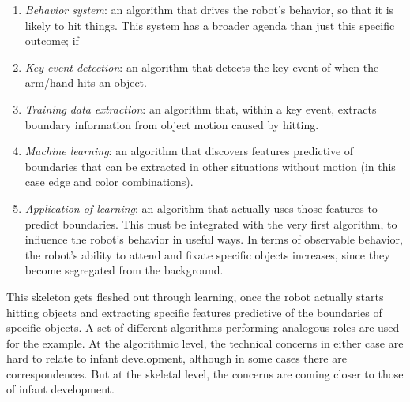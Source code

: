 \begin{enumerate} \pflist

\item {\em Behavior system}: an algorithm that drives the robot's
behavior, so that it is likely to hit things.  This system has a 
broader agenda than just this specific outcome; if

\item {\em Key event detection}: an algorithm that detects the key event of
when the arm/hand hits an object.

\item {\em Training data extraction}: an algorithm that, within a key event,
extracts boundary information from object motion caused by hitting.

\item {\em Machine learning}: an algorithm that discovers features
predictive of boundaries that can be extracted in other situations
without motion (in this case edge and color combinations).

\item {\em Application of learning}: an algorithm that actually uses
those features to predict boundaries.  This must be integrated with
the very first algorithm, to influence the robot's behavior in useful
ways.  In terms of observable behavior, the robot's ability to attend
and fixate specific objects increases, since they become segregated from
the background.

\end{enumerate}

\noindent
This skeleton gets fleshed out through learning, once the
robot actually starts hitting objects and extracting specific features
predictive of the boundaries of specific objects.  
%
A set of different algorithms performing analogous roles are used
for the  example.
%
%
At the algorithmic level, the technical concerns in either
case are hard to relate to
infant development, although in some cases there are correspondences.
But at the skeletal level, the concerns are coming closer to those of
infant development.

%


